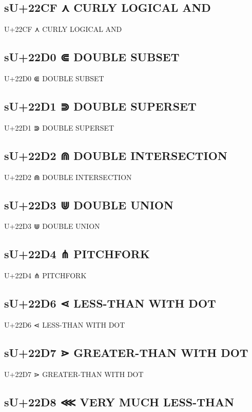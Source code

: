 \subsection{sU+22CF ⋏ CURLY LOGICAL AND}

U+22CF ⋏ CURLY LOGICAL AND

\subsection{sU+22D0 ⋐ DOUBLE SUBSET}

U+22D0 ⋐ DOUBLE SUBSET

\subsection{sU+22D1 ⋑ DOUBLE SUPERSET}

U+22D1 ⋑ DOUBLE SUPERSET

\subsection{sU+22D2 ⋒ DOUBLE INTERSECTION}

U+22D2 ⋒ DOUBLE INTERSECTION

\subsection{sU+22D3 ⋓ DOUBLE UNION}

U+22D3 ⋓ DOUBLE UNION

\subsection{sU+22D4 ⋔ PITCHFORK}

U+22D4 ⋔ PITCHFORK

\subsection{sU+22D6 ⋖ LESS-THAN WITH DOT}

U+22D6 ⋖ LESS-THAN WITH DOT

\subsection{sU+22D7 ⋗ GREATER-THAN WITH DOT}

U+22D7 ⋗ GREATER-THAN WITH DOT

\subsection{sU+22D8 ⋘ VERY MUCH LESS-THAN}

